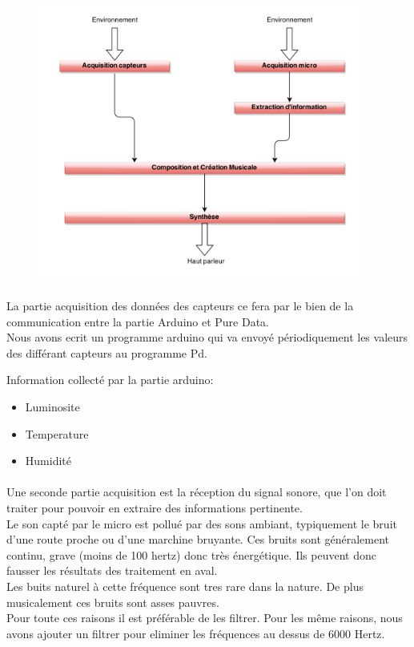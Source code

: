 \documentclass[a4paper, titlepage, oneside, 12pt]{article}%
\begin{document}
\begin{figure}
  \centering
  \includegraphics[width=400px]{structprojet.jpg}
\end{figure}

\paragraph{}
La partie acquisition des données des capteurs ce fera par le bien de la communication entre la partie Arduino et Pure Data.\\
Nous avons ecrit un programme arduino qui va envoyé périodiquement les valeurs des différant capteurs au programme Pd.

Information collecté par la partie arduino:
\begin{itemize}
\item Luminosite
\item Temperature
\item Humidité
\end{itemize}

\paragraph{}
Une seconde partie acquisition est la réception du signal sonore, que l'on doit traiter pour pouvoir en extraire des informations pertinente.\\
Le son capté par le micro est pollué par des sons ambiant, typiquement le bruit d'une route proche ou d'une marchine bruyante. Ces bruits sont généralement continu, grave (moins  de 100 hertz) donc très énergétique. Ils peuvent donc fausser les résultats des traitement en aval.\\
 Les buits naturel à cette fréquence sont tres rare dans la nature. De plus musicalement ces bruits sont asses pauvres.\\
Pour toute ces raisons il est préférable de les filtrer. Pour les même raisons, nous avons ajouter un filtrer pour eliminer les fréquences au dessus de 6000 Hertz.
\end{document}
